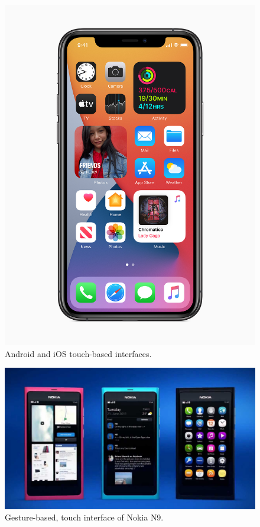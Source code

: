 \begin{frame}
\begin{figure}
    \includegraphics[height=0.8\textheight]{fig/ios14.jpg}
    \caption{Android and iOS touch-based interfaces.}
  \end{figure}
\end{frame}

\begin{frame}
  \begin{figure}
    \includegraphics[width=\columnwidth]{fig/nokia-n9.jpg}
    \caption{Gesture-based, touch interface of Nokia N9.}
  \end{figure}
\end{frame}

